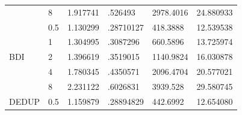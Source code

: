 \begin{table}[]
{\begin{tabular}{llllll}
    \multicolumn{1}{l|}{}                          & \multicolumn{1}{l|}{8}   & 1.917741                                                                          & .526493                                                                                & 2978.4016                                                                        & 24.880933                      \\ \cline{1-2}
    \multicolumn{1}{l|}{\multirow{5}{*}{BDI}}      & \multicolumn{1}{l|}{0.5} & 1.130299                                                                          & .28710127                                                                              & 418.3888                                                                         & 12.539538                      \\
    \multicolumn{1}{l|}{}                          & \multicolumn{1}{l|}{1}   & 1.304995                                                                          & .3087296                                                                               & 660.5896                                                                         & 13.725974                      \\
    \multicolumn{1}{l|}{}                          & \multicolumn{1}{l|}{2}   & 1.396619                                                                          & .3519015                                                                               & 1140.9824                                                                        & 16.030878                      \\
    \multicolumn{1}{l|}{}                          & \multicolumn{1}{l|}{4}   & 1.780345                                                                          & .4350571                                                                               & 2096.4704                                                                        & 20.577021                      \\
    \multicolumn{1}{l|}{}                          & \multicolumn{1}{l|}{8}   & 2.231122                                                                          & .6026831                                                                               & 3939.528                                                                         & 29.580745                      \\ \cline{1-2}
    \multicolumn{1}{l|}{\multirow{5}{*}{DEDUP}}    & \multicolumn{1}{l|}{0.5} & 1.159879                                                                          & .28894829                                                                              & 442.6992                                                                         & 12.654080                      \\

\end{tabular}}
\end{table}

